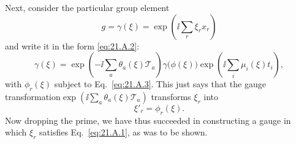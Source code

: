 Next, consider the particular group element
\begin{equation}
 g=\gamma(\xi)=\exp\left(\ii\sum_r\xi_rx_r\right)
 \tag{21.A.9}\label{eq:21.A.9}
\end{equation}
and write it in the form \eqref{eq:21.A.2}:
\begin{equation}
 \gamma(\xi)
 =\exp\left(-\ii\sum_a\theta_a(\xi)\mathcal T_a\right)
 \gamma\bigl(\phi(\xi)\bigr)
 \exp\left(\ii\sum_i\mu_i(\xi)t_i\right),
 \tag{21.A.10}\label{eq:21.A.10}
\end{equation}
with $\phi_r(\xi)$ subject to Eq.~\eqref{eq:21.A.3}. This just says that the
gauge transformation\linebreak[4]
$\exp\left(\ii\sum_a\theta_a(\xi)\mathcal T_a\right)$
transforms $\xi_r$ into
\begin{equation}
 \xi'_r=\phi_r(\xi).
 \tag{21.A.11}\label{eq:21.A.11}
\end{equation}
Now dropping the prime, we have thus succeeded in constructing a gauge in
which $\xi_r$ satisfies Eq.~\eqref{eq:21.A.1}, as was to be shown.
